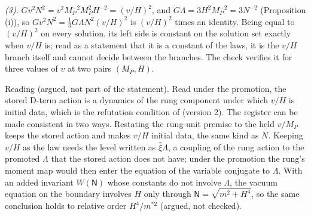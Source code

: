 \emph{(3).} $Gv^{2}N^{2} = v^{2}M_{P}^{-2}M_{P}^{2}H^{-2} = (v/H)^{2}$, and $G\Lambda = 3H^{2}M_{P}^{-2} = 3N^{-2}$ (Proposition (i)), so $Gv^{2}N^{2} = \tfrac13 G\Lambda N^{2}(v/H)^{2}$ is $(v/H)^{2}$ times an identity. Being equal to $(v/H)^{2}$ on every solution, its left side is constant on the solution set exactly when $v/H$ is; read as a statement that it is a constant of the laws, it is the $v/H$ branch itself and cannot decide between the branches. The check verifies it for three values of $v$ at two pairs $(M_{P}, H)$.

Reading (argued, not part of the statement). Read under the promotion, the stored D-term action is a dynamics of the rung component under which $v/H$ is initial data, which is the refutation condition of  (version 2). The register can be made consistent in two ways. Restating the rung-unit premise to the held $v/M_{P}$ keeps the stored action and makes $v/H$ initial data, the same kind as $N$. Keeping $v/H$ as the law needs the level written as $\hat{\xi}\Lambda$, a coupling of the rung action to the promoted $\Lambda$ that the stored action does not have; under the promotion the rung's moment map would then enter the equation of the variable conjugate to $\Lambda$. With an added invariant $W(\mathsf{N})$ whose constants do not involve $\Lambda$, the vacuum equation on the boundary involves $H$ only through $\mathsf{N} = \sqrt{m^{2} + H^{4}}$, so the same conclusion holds to relative order $H^{4}/m^{*2}$ (argued, not checked).
